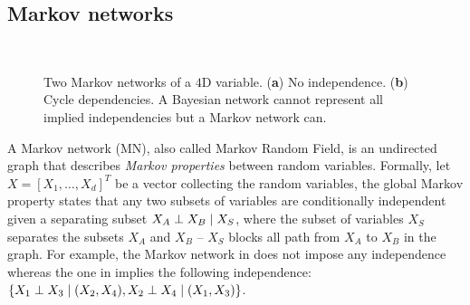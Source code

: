 \subsection{Markov networks}
\begin{figure}
    \centering
    \begin{subfigure}{.45\textwidth}
        \centering
        \caption{}\label{fig:MN-fig-a}
    \end{subfigure}~\hspace{-4.8em}
    \begin{subfigure}{.45\textwidth}
    \centering
        \caption{}\label{fig:MN-fig-b}
    \end{subfigure}
    \caption{Two Markov networks of a $4$D variable. (\textbf{a}) No independence. (\textbf{b}) Cycle dependencies. A Bayesian network cannot represent all implied independencies but a Markov network can.} \label{fig:MN-fig}
\end{figure}
A Markov network (MN), also called Markov Random Field, is an undirected graph that describes \textit{Markov properties} between random variables. Formally, let $X = \left[X_1, \hdots, X_d\right]^T$ be a vector collecting the random variables, the global Markov property states that any two subsets of variables are conditionally independent given a separating subset $X_A \perp X_B \mid X_S$, where the subset of variables $X_S$ separates the subsets $X_A$ and $X_B$ -- $X_S$ blocks all path from $X_A$ to $X_B$ in the graph. For example, the Markov network in  does not impose any independence whereas the one in  implies the following independence: $\{ X_1 \perp X_3 \mid (X_2, X_4), X_2 \perp X_4 \mid (X_1, X_3)\}$.

